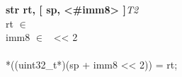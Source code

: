 


\begin{instructionblock}{\imagewidth}%
    \textbf{str rt, [ sp, <\#imm8> ]}\hfill\textit{T2}\\
    rt $\in$ \baseregisters\\
    imm8 $\in$ \immEight\ {<}{<} 2\\
    {}\\
    *((uint32\_t*)(sp + imm8 {<}{<} 2)) = rt;
\end{instructionblock}

